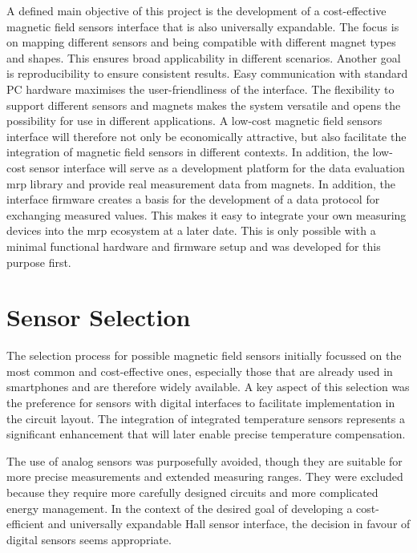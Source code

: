 A defined main objective of this project is the development of a
cost-effective magnetic field sensors interface that is also universally
expandable. The focus is on mapping different sensors and being
compatible with different magnet types and shapes. This ensures broad
applicability in different scenarios. Another goal is reproducibility to
ensure consistent results. Easy communication with standard PC hardware
maximises the user-friendliness of the interface. The flexibility to
support different sensors and magnets makes the system versatile and
opens the possibility for use in different applications. A low-cost
magnetic field sensors interface will therefore not only be economically
attractive, but also facilitate the integration of magnetic field
sensors in different contexts. In addition, the low-cost sensor
interface will serve as a development platform for the data evaluation
\gls{mrp} library and provide real measurement data from magnets. In
addition, the interface firmware creates a basis for the development of
a data protocol for exchanging measured values. This makes it easy to
integrate your own measuring devices into the \gls{mrp} ecosystem at a
later date. This is only possible with a minimal functional hardware and
firmware setup and was developed for this purpose first.

\hypertarget{sensor-selection}{%
\section{Sensor Selection}\label{sensor-selection}}

The selection process for possible magnetic field sensors initially
focussed on the most common and cost-effective ones, especially those
that are already used in smartphones and are therefore widely available.
A key aspect of this selection was the preference for sensors with
digital interfaces to facilitate implementation in the circuit layout.
The integration of integrated temperature sensors represents a
significant enhancement that will later enable precise temperature
compensation.

The use of analog sensors was purposefully avoided, though they are
suitable for more precise measurements and extended measuring ranges.
They were excluded because they require more carefully designed circuits
and more complicated energy management. In the context of the desired
goal of developing a cost-efficient and universally expandable Hall
sensor interface, the decision in favour of digital sensors seems
appropriate.

